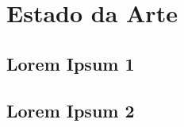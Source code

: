 \chapter{Estado da Arte}

\section{Lorem Ipsum 1}

\lipsum[1-4]

\section{Lorem Ipsum 2}

\lipsum[1-4]